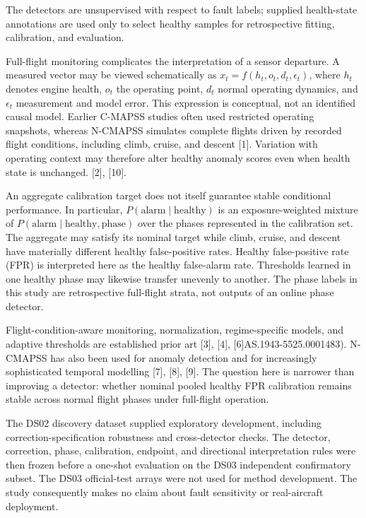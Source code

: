 \documentclass[10pt,twocolumn]{article}
\begin{document}
The detectors are unsupervised with respect to fault labels; supplied health-state annotations are used only to select healthy samples for retrospective fitting, calibration, and evaluation.

Full-flight monitoring complicates the interpretation of a sensor departure. A measured vector may be viewed schematically as \(x_t=f(h_t,o_t,d_t,\epsilon_t)\), where \(h_t\) denotes engine health, \(o_t\) the operating point, \(d_t\) normal operating dynamics, and \(\epsilon_t\) measurement and model error. This expression is conceptual, not an identified causal model. Earlier C-MAPSS studies often used restricted operating snapshots, whereas N-CMAPSS simulates complete flights driven by recorded flight conditions, including climb, cruise, and descent {[}1{]}. Variation with operating context may therefore alter healthy anomaly scores even when health state is unchanged. {[}2{]}, {[}10{]}.

An aggregate calibration target does not itself guarantee stable conditional performance. In particular, \(P(\mathrm{alarm}\mid\mathrm{healthy})\) is an exposure-weighted mixture of \(P(\mathrm{alarm}\mid\mathrm{healthy},\mathrm{phase})\) over the phases represented in the calibration set. The aggregate may satisfy its nominal target while climb, cruise, and descent have materially different healthy false-positive rates. Healthy false-positive rate (FPR) is interpreted here as the healthy false-alarm rate. Thresholds learned in one healthy phase may likewise transfer unevenly to another. The phase labels in this study are retrospective full-flight strata, not outputs of an online phase detector.

Flight-condition-aware monitoring, normalization, regime-specific models, and adaptive thresholds are established prior art {[}3{]}, {[}4{]}, {[}6{]}AS.1943-5525.0001483). N-CMAPSS has also been used for anomaly detection and for increasingly sophisticated temporal modelling {[}7{]}, {[}8{]}, {[}9{]}. The question here is narrower than improving a detector: whether nominal pooled healthy FPR calibration remains stable across normal flight phases under full-flight operation.

The DS02 discovery dataset supplied exploratory development, including correction-specification robustness and cross-detector checks. The detector, correction, phase, calibration, endpoint, and directional interpretation rules were then frozen before a one-shot evaluation on the DS03 independent confirmatory subset. The DS03 official-test arrays were not used for method development. The study consequently makes no claim about fault sensitivity or real-aircraft deployment.
\end{document}
